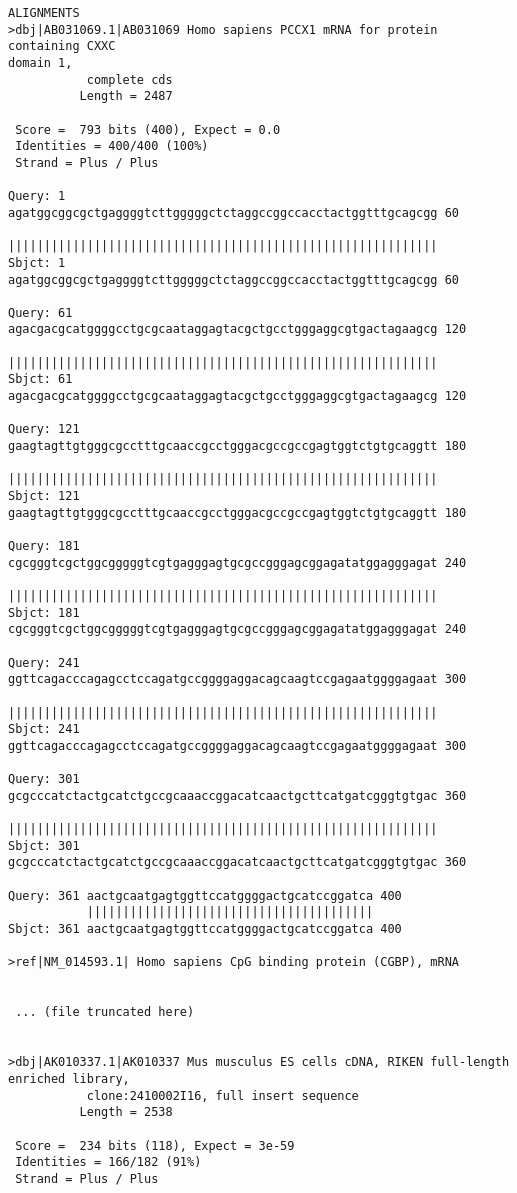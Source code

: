 \begin{lstlisting}
ALIGNMENTS
>dbj|AB031069.1|AB031069 Homo sapiens PCCX1 mRNA for protein containing CXXC
domain 1,
           complete cds
          Length = 2487

 Score =  793 bits (400), Expect = 0.0
 Identities = 400/400 (100%)
 Strand = Plus / Plus

Query: 1   agatggcggcgctgaggggtcttgggggctctaggccggccacctactggtttgcagcgg 60
           ||||||||||||||||||||||||||||||||||||||||||||||||||||||||||||
Sbjct: 1   agatggcggcgctgaggggtcttgggggctctaggccggccacctactggtttgcagcgg 60

Query: 61  agacgacgcatggggcctgcgcaataggagtacgctgcctgggaggcgtgactagaagcg 120
           ||||||||||||||||||||||||||||||||||||||||||||||||||||||||||||
Sbjct: 61  agacgacgcatggggcctgcgcaataggagtacgctgcctgggaggcgtgactagaagcg 120

Query: 121 gaagtagttgtgggcgcctttgcaaccgcctgggacgccgccgagtggtctgtgcaggtt 180
           ||||||||||||||||||||||||||||||||||||||||||||||||||||||||||||
Sbjct: 121 gaagtagttgtgggcgcctttgcaaccgcctgggacgccgccgagtggtctgtgcaggtt 180

Query: 181 cgcgggtcgctggcgggggtcgtgagggagtgcgccgggagcggagatatggagggagat 240
           ||||||||||||||||||||||||||||||||||||||||||||||||||||||||||||
Sbjct: 181 cgcgggtcgctggcgggggtcgtgagggagtgcgccgggagcggagatatggagggagat 240

Query: 241 ggttcagacccagagcctccagatgccggggaggacagcaagtccgagaatggggagaat 300
           ||||||||||||||||||||||||||||||||||||||||||||||||||||||||||||
Sbjct: 241 ggttcagacccagagcctccagatgccggggaggacagcaagtccgagaatggggagaat 300

Query: 301 gcgcccatctactgcatctgccgcaaaccggacatcaactgcttcatgatcgggtgtgac 360
           ||||||||||||||||||||||||||||||||||||||||||||||||||||||||||||
Sbjct: 301 gcgcccatctactgcatctgccgcaaaccggacatcaactgcttcatgatcgggtgtgac 360

Query: 361 aactgcaatgagtggttccatggggactgcatccggatca 400
           ||||||||||||||||||||||||||||||||||||||||
Sbjct: 361 aactgcaatgagtggttccatggggactgcatccggatca 400

>ref|NM_014593.1| Homo sapiens CpG binding protein (CGBP), mRNA


 ... (file truncated here)


>dbj|AK010337.1|AK010337 Mus musculus ES cells cDNA, RIKEN full-length
enriched library,
           clone:2410002I16, full insert sequence
          Length = 2538

 Score =  234 bits (118), Expect = 3e-59
 Identities = 166/182 (91%)
 Strand = Plus / Plus


\end{lstlisting}
